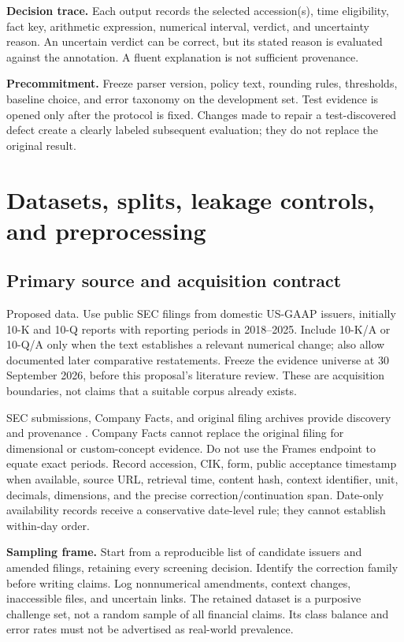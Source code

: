 \documentclass[11pt,a4paper]{article}
\newcommand{\pbreak}{\clearpage}
\newcommand{\lead}[1]{\textbf{\color{navy}#1}}
\newcommand{\status}[1]{\textsf{\color{teal}#1}}
\begin{document}
\lead{Decision trace.} Each output records the selected accession(s), time eligibility, fact key, arithmetic expression, numerical interval, verdict, and uncertainty reason. An uncertain verdict can be correct, but its stated reason is evaluated against the annotation. A fluent explanation is not sufficient provenance.

\lead{Precommitment.} Freeze parser version, policy text, rounding rules, thresholds, baseline choice, and error taxonomy on the development set. Test evidence is opened only after the protocol is fixed. Changes made to repair a test-discovered defect create a clearly labeled subsequent evaluation; they do not replace the original result.

\pbreak
\section{Datasets, splits, leakage controls, and preprocessing}
\subsection{Primary source and acquisition contract}
\status{Proposed data.} Use public SEC filings from domestic US-GAAP issuers, initially 10-K and 10-Q reports with reporting periods in 2018--2025. Include 10-K/A or 10-Q/A only when the text establishes a relevant numerical change; also allow documented later comparative restatements. Freeze the evidence universe at 30 September 2026, before this proposal's literature review. These are acquisition boundaries, not claims that a suitable corpus already exists.

SEC submissions, Company Facts, and original filing archives provide discovery and provenance \cite{sec}. Company Facts cannot replace the original filing for dimensional or custom-concept evidence. Do not use the Frames endpoint to equate exact periods. Record accession, CIK, form, public acceptance timestamp when available, source URL, retrieval time, content hash, context identifier, unit, decimals, dimensions, and the precise correction/continuation span. Date-only availability records receive a conservative date-level rule; they cannot establish within-day order.

\lead{Sampling frame.} Start from a reproducible list of candidate issuers and amended filings, retaining every screening decision. Identify the correction family before writing claims. Log nonnumerical amendments, context changes, inaccessible files, and uncertain links. The retained dataset is a purposive challenge set, not a random sample of all financial claims. Its class balance and error rates must not be advertised as real-world prevalence.
\end{document}
